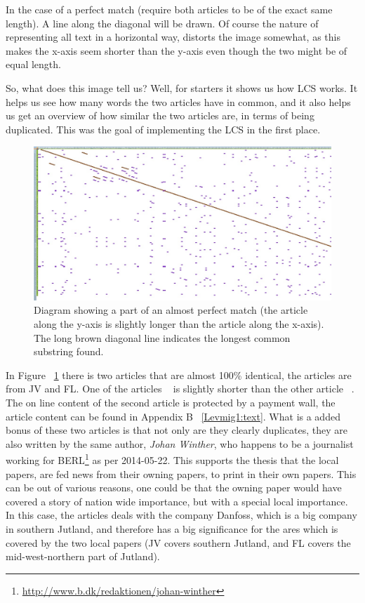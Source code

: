 In the case of a perfect match (require both articles to be of the exact same length). A line along the diagonal will be drawn. Of course the nature of representing all text in a horizontal way, distorts the image somewhat, as this makes the x-axis seem shorter than the y-axis even though the two might be of equal length. 

So, what does this image tell us? Well, for starters it shows us how LCS works. It helps us see how many words the two articles have in common, and it also helps us get an overview of how similar the two articles are, in terms of being duplicated. This was the goal of implementing the LCS in the first place.

\begin{figure}
	\centering
	\includegraphics[scale=0.35]{figures/PerfectMatch}
	\caption{Diagram showing a part of an almost perfect match (the article along the y-axis is slightly longer than the article along the x-axis). The long brown diagonal line indicates the longest common substring found.}
	\label{Match}
\end{figure}

In Figure ~\ref{Match} there is two articles that are almost 100\% identical, the articles are from JV and FL. One of the articles ~\cite{JV1} is slightly shorter than the other article ~\cite{Lemvig1}. The on line content of the second article is protected by a payment wall, the article content can be found in Appendix B ~\ref{Levmig1:text}.
What is a added bonus of these two articles is that not only are they clearly duplicates, they are also written by the same author, \textit{Johan Winther}, who happens to be a journalist working for BERL\footnote{\url{http://www.b.dk/redaktionen/johan-winther}} as per 2014-05-22. This supports the thesis that the local papers, are fed news from their owning papers, to print in their own papers. This can be out of various reasons, one could be that the owning paper would have covered a story of nation wide importance, but with a special local importance. In this case, the articles deals with the company Danfoss, which is a big company in southern Jutland, and therefore has a big significance for the ares which is covered by the two local papers (JV covers southern Jutland, and FL covers the mid-west-northern part of Jutland).

